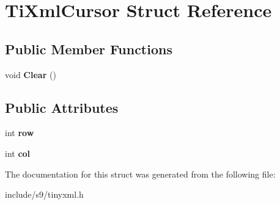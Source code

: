 \hypertarget{structTiXmlCursor}{\section{\-Ti\-Xml\-Cursor \-Struct \-Reference}
\label{structTiXmlCursor}
}
\subsection*{\-Public \-Member \-Functions}
\begin{DoxyCompactItemize}
\item 
\hypertarget{structTiXmlCursor_a1e6fa622b59dafb71b6efe595105dcdd}{void {\bfseries \-Clear} ()}\label{structTiXmlCursor_a1e6fa622b59dafb71b6efe595105dcdd}

\end{DoxyCompactItemize}
\subsection*{\-Public \-Attributes}
\begin{DoxyCompactItemize}
\item 
\hypertarget{structTiXmlCursor_a5b54dd949820c2db061e2be41f3effb3}{int {\bfseries row}}\label{structTiXmlCursor_a5b54dd949820c2db061e2be41f3effb3}

\item 
\hypertarget{structTiXmlCursor_a5694d7ed2c4d20109d350c14c417969d}{int {\bfseries col}}\label{structTiXmlCursor_a5694d7ed2c4d20109d350c14c417969d}

\end{DoxyCompactItemize}


\-The documentation for this struct was generated from the following file\-:\begin{DoxyCompactItemize}
\item 
include/s9/tinyxml.\-h\end{DoxyCompactItemize}
